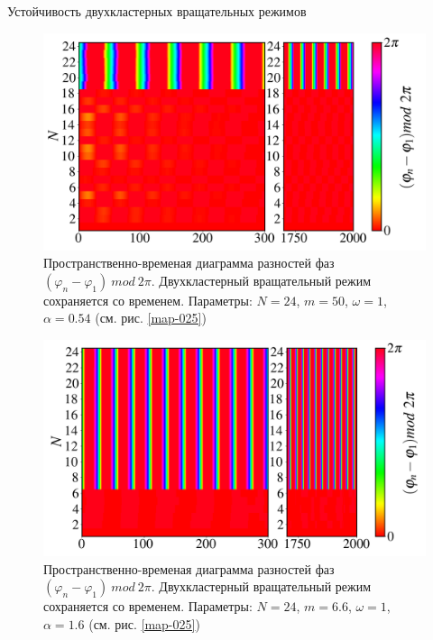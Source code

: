 \begin{chapter}{Устойчивость двухкластерных вращательных режимов}
	\begin{figure}[h!]
		\begin{center}
			\includegraphics[width=1\columnwidth]{pictures/Figure_M_50_A_0.54_O_1.png}
		\end{center}
		\caption{Пространственно-временая диаграмма разностей фаз $(\varphi_n - \varphi_1) \ mod \ 2\pi$.
		Двухкластерный вращательный режим сохраняется со временем.
		Параметры: $N=24$, $m = 50$, $\omega = 1$, $\alpha = 0.54$ (см. рис. \ref{map-025})}
		\label{st-c-3}
	\end{figure}

	\begin{figure}[h!]
		\begin{center}
			\includegraphics[width=1\columnwidth]{pictures/Figure_d.png}
		\end{center}
		\caption{Пространственно-временая диаграмма разностей фаз $(\varphi_n - \varphi_1) \ mod \ 2\pi$.
		Двухкластерный вращательный режим сохраняется со временем.
		Параметры: $N=24$, $m = 6.6$, $\omega = 1$, $\alpha = 1.6$ (см. рис. \ref{map-025})}
		\label{st-c-4}
	\end{figure}



\end{chapter}
